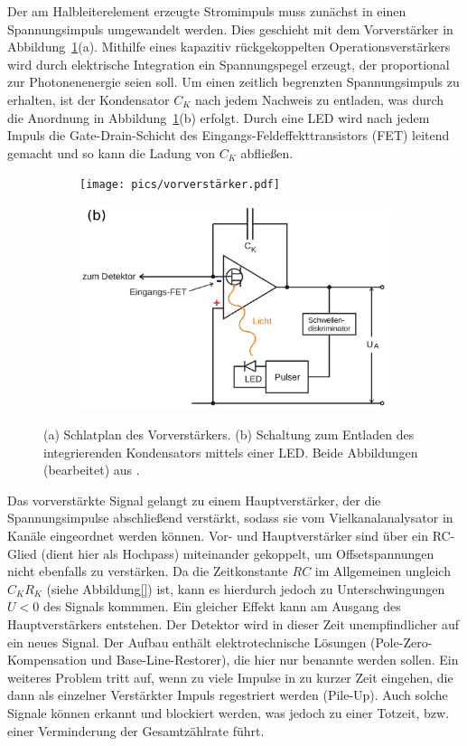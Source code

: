 Der am Halbleiterelement erzeugte Stromimpuls muss zunächst in einen Spannungsimpuls umgewandelt werden. Dies geschieht mit 
dem Vorverstärker in Abbildung~\ref{fig: vorverstaerker}(a). Mithilfe eines kapazitiv rückgekoppelten Operationsverstärkers wird durch elektrische 
Integration ein Spannungspegel erzeugt, der proportional zur Photonenenergie seien soll. Um einen zeitlich 
begrenzten Spannungsimpuls zu erhalten, ist der Kondensator $C_K$ nach jedem Nachweis zu entladen, was durch die 
Anordnung in Abbildung~\ref{fig: vorverstaerker}(b) erfolgt. Durch eine LED wird nach jedem Impuls die Gate-Drain-Schicht des 
Eingangs-Feldeffekttransistors (FET) leitend gemacht und so kann die Ladung von $C_K$ abfließen.
\begin{figure}
\centering
\begin{subfigure}{0.49\textwidth}
\centering
\texttt{[image: pics/vorverstärker.pdf]}
\end{subfigure}
\begin{subfigure}{0.49\textwidth}
\centering
\includegraphics[width = \textwidth]{pics/led.pdf}
\end{subfigure}
\caption{(a) Schlatplan des Vorverstärkers. (b) Schaltung zum Entladen des integrierenden Kondensators mittels einer LED.
Beide Abbildungen (bearbeitet) aus \cite{anleitungv18}.}
\label{fig: vorverstaerker}
\end{figure}

Das vorverstärkte Signal gelangt zu einem Hauptverstärker, der die Spannungsimpulse abschließend verstärkt, sodass 
sie vom Vielkanalanalysator in Kanäle eingeordnet werden können. Vor- und Hauptverstärker sind über ein RC-Glied (dient hier als Hochpass)
miteinander gekoppelt, um Offsetspannungen nicht ebenfalls zu verstärken. Da die Zeitkonstante $RC$ im Allgemeinen ungleich 
$C_K R_K$ (siehe Abbildung\ref{}) ist, kann es hierdurch jedoch zu Unterschwingungen $U < 0$ des Signals kommmen. Ein gleicher Effekt kann 
am Ausgang des Hauptverstärkers entstehen. Der Detektor wird in dieser Zeit unempfindlicher auf ein neues Signal. Der Aufbau enthält 
elektrotechnische Lösungen (Pole-Zero-Kompensation und Base-Line-Restorer), die hier nur benannte werden sollen. Ein weiteres Problem tritt auf, wenn 
zu viele Impulse in zu kurzer Zeit eingehen, die dann als einzelner Verstärkter Impuls regestriert werden (Pile-Up). Auch solche Signale 
können erkannt und blockiert werden, was jedoch zu einer Totzeit, bzw. einer Verminderung der Gesamtzählrate führt.


